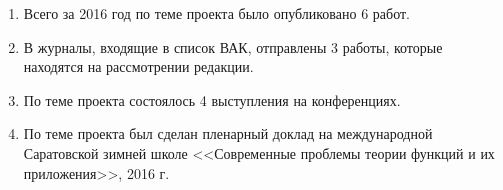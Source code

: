\begin{enumerate}[1.]
  \item Всего за 2016 год по теме проекта было опубликовано 6 работ.
  \item В журналы, входящие в список ВАК, отправлены 3 работы, которые находятся на рассмотрении редакции.	
  \item По теме проекта состоялось 4 выступления на конференциях.
  \item По теме проекта был сделан пленарный доклад на международной Саратовской зимней школе <<Современные проблемы теории функций и их приложения>>, 2016 г.
\end{enumerate}



































